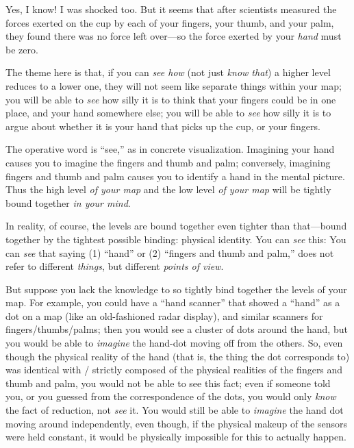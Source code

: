 {
 Yes, I know! I was shocked too. But it seems that after scientists
measured the forces exerted on the cup by each of your fingers, your
thumb, and your palm, they found there was no force left over---so the
force exerted by your \textit{hand} must be zero.}

{
 The theme here is that, if you can \textit{see how} (not just
\textit{know that}) a higher level reduces to a lower one, they will
not seem like separate things within your map; you will be able to
\textit{see} how silly it is to think that your fingers could be in one
place, and your hand somewhere else; you will be able to \textit{see}
how silly it is to argue about whether it is your hand that picks up
the cup, or your fingers.}

{
 The operative word is ``see,''
as in concrete visualization. Imagining your hand causes you to imagine
the fingers and thumb and palm; conversely, imagining fingers and thumb
and palm causes you to identify a hand in the mental picture. Thus the
high level \textit{of your map} and the low level \textit{of your map}
will be tightly bound together \textit{in your mind}.}

{
 In reality, of course, the levels are bound together even tighter
than that---bound together by the tightest possible binding: physical
identity. You can \textit{see} this: You can \textit{see} that saying
(1) ``hand'' or (2)
``fingers and thumb and palm,'' does
not refer to different \textit{things}, but different \textit{points of
view}.}

{
 But suppose you lack the knowledge to so tightly bind together the
levels of your map. For example, you could have a
``hand scanner'' that showed a
``hand'' as a dot on a map (like an
old-fashioned radar display), and similar scanners for
fingers/thumbs/palms; then you would see a cluster of dots around the
hand, but you would be able to \textit{imagine} the hand-dot moving off
from the others. So, even though the physical reality of the hand (that
is, the thing the dot corresponds to) was identical with / strictly
composed of the physical realities of the fingers and thumb and palm,
you would not be able to see this fact; even if someone told you, or
you guessed from the correspondence of the dots, you would only
\textit{know} the fact of reduction, not \textit{see} it. You would
still be able to \textit{imagine} the hand dot moving around
independently, even though, if the physical makeup of the sensors were
held constant, it would be physically impossible for this to actually
happen.}

